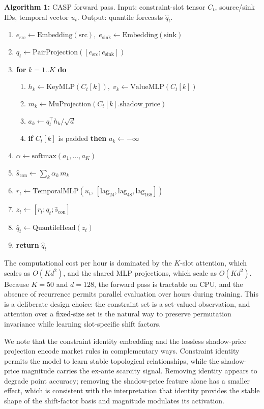 \documentclass{article}
\begin{document}
\vspace{0.5em}\noindent\textbf{Algorithm 1:} CASP forward pass. Input: constraint-slot tensor $C_t$, source/sink IDs, temporal vector $u_t$. Output: quantile forecasts $\hat{q}_t$.
\begin{enumerate}
  \item $e_{\mathrm{src}} \leftarrow \mathrm{Embedding}(\mathrm{src}),\; e_{\mathrm{sink}} \leftarrow \mathrm{Embedding}(\mathrm{sink})$
  \item $q_t \leftarrow \mathrm{PairProjection}([e_{\mathrm{src}}; e_{\mathrm{sink}}])$
  \item \textbf{for} $k = 1..K$\textbf{ do}
    \begin{enumerate}
      \item $h_k \leftarrow \mathrm{KeyMLP}(C_t[k]),\; v_k \leftarrow \mathrm{ValueMLP}(C_t[k])$
      \item $m_k \leftarrow \mathrm{MuProjection}(C_t[k].\text{shadow\_price})$
      \item $a_k \leftarrow q_t^{\top} h_k / \sqrt{d}$
      \item \textbf{if} $C_t[k]$ is padded \textbf{then} $a_k \leftarrow -\infty$
    \end{enumerate}
  \item $\alpha \leftarrow \mathrm{softmax}(a_1,\dots,a_K)$
  \item $\hat{s}_{\mathrm{con}} \leftarrow \sum_k \alpha_k\, m_k$
  \item $r_t \leftarrow \mathrm{TemporalMLP}(u_t,\, [\mathrm{lag}_{24}, \mathrm{lag}_{48}, \mathrm{lag}_{168}])$
  \item $z_t \leftarrow [r_t; q_t; \hat{s}_{\mathrm{con}}]$
  \item $\hat{q}_t \leftarrow \mathrm{QuantileHead}(z_t)$
  \item \textbf{return} $\hat{q}_t$
\end{enumerate}

The computational cost per hour is dominated by the $K$-slot attention, which scales as $O(K d^2)$, and the shared MLP projections, which scale as $O(K d^2)$. Because $K = 50$ and $d = 128$, the forward pass is tractable on CPU, and the absence of recurrence permits parallel evaluation over hours during training. This is a deliberate design choice: the constraint set is a set-valued observation, and attention over a fixed-size set is the natural way to preserve permutation invariance while learning slot-specific shift factors.

We note that the constraint identity embedding and the lossless shadow-price projection encode market rules in complementary ways. Constraint identity permits the model to learn stable topological relationships, while the shadow-price magnitude carries the ex-ante scarcity signal. Removing identity appears to degrade point accuracy; removing the shadow-price feature alone has a smaller effect, which is consistent with the interpretation that identity provides the stable shape of the shift-factor basis and magnitude modulates its activation.
\end{document}

